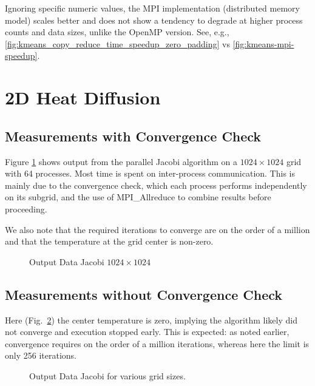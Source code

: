 \documentclass{article}
\newcommand{\eng}[1]{#1}
\begin{document}
Ignoring specific numeric values, the \eng{MPI} implementation (distributed memory model) scales better and does not show a tendency to degrade at higher process counts and data sizes, unlike the \eng{OpenMP} version. See, e.g., \ref{fig:kmeans_copy_reduce_time_speedup_zero_padding} vs \ref{fig:kmeans-mpi-speedup}.

\section{2D Heat Diffusion}

\subsection{Measurements with Convergence Check}

Figure \ref{fig:jacobi_conv_check} shows output from the parallel \eng{Jacobi} algorithm on a $1024 \times 1024$ grid with 64 processes. Most time is spent on inter-process communication. This is mainly due to the convergence check, which each process performs independently on its subgrid, and the use of \eng{MPI\_Allreduce} to combine results before proceeding.

We also note that the required iterations to converge are on the order of a million and that the temperature at the grid center is non-zero.

\begin{figure}[h]
    \small
    \caption{Output Data \eng{Jacobi} $1024 \times 1024$}
    \label{fig:jacobi_conv_check}
\end{figure}
\FloatBarrier

\subsection{Measurements without Convergence Check}

Here (Fig.~\ref{fig:jacobi_no_conv_check}) the center temperature is zero, implying the algorithm likely did not converge and execution stopped early. This is expected: as noted earlier, convergence requires on the order of a million iterations, whereas here the limit is only 256 iterations.

\begin{figure}[h]
    \small
    \caption{Output Data \eng{Jacobi} for various grid sizes.}
    \label{fig:jacobi_no_conv_check}
\end{figure}
\FloatBarrier
\end{document}
